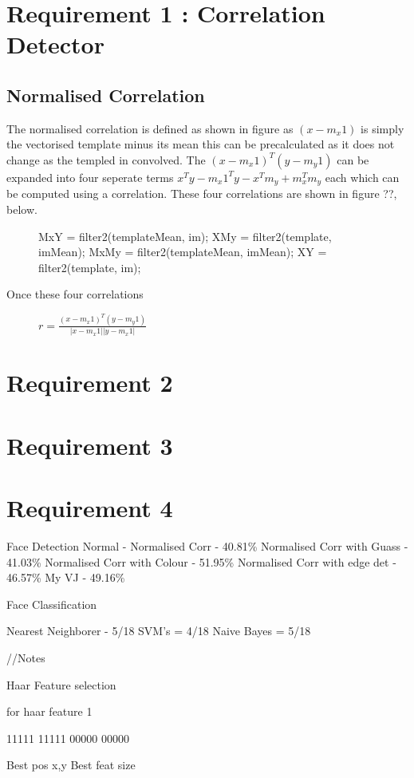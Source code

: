 

\section{Requirement 1 : Correlation Detector}

\subsection{Normalised Correlation}

The normalised correlation is defined as shown in figure as $(x-m_x1)$ is simply
the vectorised template minus its mean this can be precalculated as it does not
change as the templed in convolved. The $(x-m_x1)^T(y-m_y1)$ can be expanded into
four seperate terms $x^Ty - m_x1^Ty - x^Tm_y + m_x^Tm_y$ each which can be computed
using a correlation. These four correlations are shown in figure ??, below.

\begin{figure}
MxY = filter2(templateMean, im);
XMy = filter2(template, imMean);
MxMy = filter2(templateMean, imMean);
XY = filter2(template, im);
\end{figure}

Once these four correlations


\begin{figure}
$r=\frac{(x-m_x1)^T(y-m_y1)}{|x-m_x1||y-m_x1|}$
\end{figure}

\section{Requirement 2}

\section{Requirement 3}

\section{Requirement 4}

Face Detection
Normal -
Normalised Corr - 40.81\%
Normalised Corr with Guass - 41.03\%
Normalised Corr with Colour - 51.95\%
Normalised Corr with edge det - 46.57\%
My VJ - 49.16\%

Face Classification

Nearest Neighborer - 5/18
SVM's = 4/18
Naive Bayes = 5/18




//Notes

Haar Feature selection

for haar feature 1

11111
11111
00000
00000

Best pos x,y
Best feat size